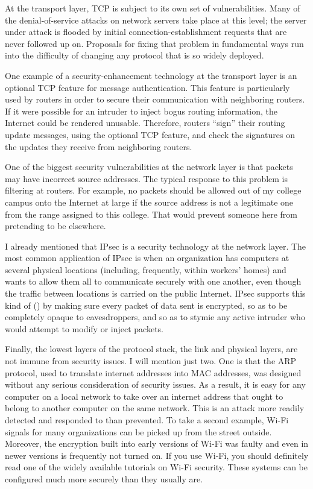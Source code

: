 At the transport layer, TCP is subject to its own set of
vulnerabilities.  Many of the denial-of-service attacks on network
servers take place at this level; the server under attack is flooded
by initial connection-establishment requests that are never followed
up on.  Proposals for
fixing that problem in fundamental ways run into the difficulty of
changing any protocol that is so widely deployed.

One example of a security-enhancement technology at the transport
layer is an optional TCP feature for message authentication.  This
feature is particularly used by routers in order to secure their
communication with neighboring routers.  If it were possible for an
intruder to inject bogus routing information, the Internet could be
rendered unusable.  Therefore, routers ``sign'' their routing update
messages, using the optional TCP feature, and check the signatures on
the updates they receive from neighboring routers.

One of the biggest security vulnerabilities at the network layer is
that packets may have incorrect source addresses.  The typical response to
this problem is filtering at routers.  For example, no packets should
be allowed out of my college campus onto the Internet at large if the
source address is not a legitimate one from the range assigned to this
college.  That would prevent someone here from pretending to be
elsewhere.

I already mentioned that IPsec is a security technology at the network
layer.  The most common application of IPsec is when an organization
has computers at several physical locations (including, frequently,
within workers' homes) and wants to allow them all to communicate
securely with one another, even though the traffic between locations
is carried on the public Internet.  IPsec supports this kind of
 () by making sure every
packet of data sent is encrypted, so as to be completely opaque to
eavesdroppers, and so as to stymie any active intruder who would attempt
to modify or inject packets.

Finally, the lowest layers of the protocol stack, the link and
physical layers, are not immune from security issues.  I will mention
just two.  One is that the ARP protocol, used to translate internet
addresses into MAC addresses, was designed without any serious
consideration of security issues.  As a result, it is easy for any
computer on a local network to take over an internet address that
ought to belong to another computer on the same network.  This is an
attack more readily detected and responded to than prevented.  To take
a second example, Wi-Fi signals for many organizations can be picked
up from the street outside.  Moreover, the encryption built into early
versions of Wi-Fi was faulty and even in newer versions is frequently
not turned on.  If you use Wi-Fi, you should definitely read one of
the widely available tutorials on Wi-Fi security.  These systems can
be configured much more securely than they usually are.

